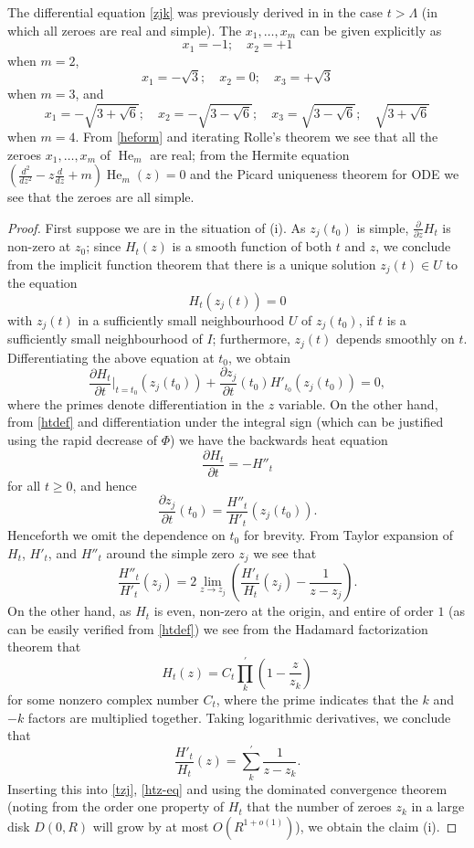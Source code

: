 The differential equation \eqref{zjk} was previously derived in \cite[Lemma 2.4]{csv} in the case $t > \Lambda$ (in which all zeroes are real and simple).
The $x_1,\dots,x_m$ can be given explicitly as
$$ x_1 = -1; \quad x_2 = +1$$
when $m=2$,
$$ x_1 = -\sqrt{3}; \quad x_2 = 0; \quad x_3 = +\sqrt{3}$$
when $m=3$, and
$$ x_1 = -\sqrt{3+\sqrt{6}}; \quad x_2 = -\sqrt{3-\sqrt{6}}; \quad x_3 = \sqrt{3 - \sqrt{6}}; \quad \sqrt{3 + \sqrt{6}}$$
when $m=4$.  From \eqref{heform} and iterating Rolle's theorem we see that all the zeroes $x_1,\dots,x_m$ of $\operatorname{He}_m$ are real; from the Hermite equation $\left(\frac{d^2}{dz^2} - z \frac{d}{dz} + m\right) \operatorname{He}_m(z) = 0$ and the Picard uniqueness theorem for ODE we see that the zeroes are all simple.

\begin{proof}  First suppose we are in the situation of (i).  As $z_j(t_0)$ is simple, $\frac{\partial}{\partial z} H_t$ is non-zero at $z_0$; since $H_t(z)$ is a smooth function of both $t$ and $z$, we conclude from the implicit function theorem that there is a unique solution $z_j(t) \in U$ to the equation
$$ H_t( z_j(t) ) = 0$$
with $z_j(t)$ in a sufficiently small neighbourhood $U$ of $z_j(t_0)$, if $t$ is a sufficiently small neighbourhood of $I$; furthermore, $z_j(t)$ depends smoothly on $t$.  Differentiating the above equation at $t_0$, we obtain
$$ \frac{\partial H_t}{\partial t}|_{t=t_0}( z_j(t_0) ) + \frac{\partial z_j}{\partial t}(t_0) H'_{t_0}(z_j(t_0)) = 0,$$
where the primes denote differentiation in the $z$ variable.
On the other hand, from \eqref{htdef} and differentiation under the integral sign (which can be justified using the rapid decrease of $\Phi$) we have the backwards heat equation
\begin{equation}\label{back}
\frac{\partial H_t}{\partial t} = -H''_t
\end{equation}
for all $t \geq 0$, and hence
\begin{equation}\label{tzj}
\frac{\partial z_j}{\partial t}(t_0)  = \frac{H''_t}{H'_t}( z_j(t_0) ).
\end{equation}
Henceforth we omit the dependence on $t_0$ for brevity.  From Taylor expansion of $H_t$, $H'_t$, and $H''_t$ around the simple zero $z_j$ we see that
\begin{equation}\label{htz-eq}
 \frac{H''_t}{H'_t}( z_j) = 2 \lim_{z \to z_j}\left(  \frac{H'_t}{H_t}( z_j) - \frac{1}{z-z_j} \right).
\end{equation}
On the other hand, as $H_t$ is even, non-zero at the origin, and entire of order $1$ (as can be easily verified from \eqref{htdef}) we see from the Hadamard factorization theorem that
$$ H_t(z) = C_t \prod_k^{\prime} \left(1 - \frac{z}{z_k}\right)$$
for some nonzero complex number $C_t$, where the prime indicates that the $k$ and $-k$ factors are multiplied together.  Taking logarithmic derivatives, we conclude that
$$ \frac{H'_t}{H_t}(z) = \sum_k^{\prime} \frac{1}{z-z_k}.$$
Inserting this into \eqref{tzj}, \eqref{htz-eq} and using the dominated convergence theorem (noting from the order one property of $H_t$ that the number of zeroes $z_k$ in a large disk $D(0,R)$ will grow by at most $O(R^{1+o(1)})$), we obtain the claim (i).


\end{proof}
